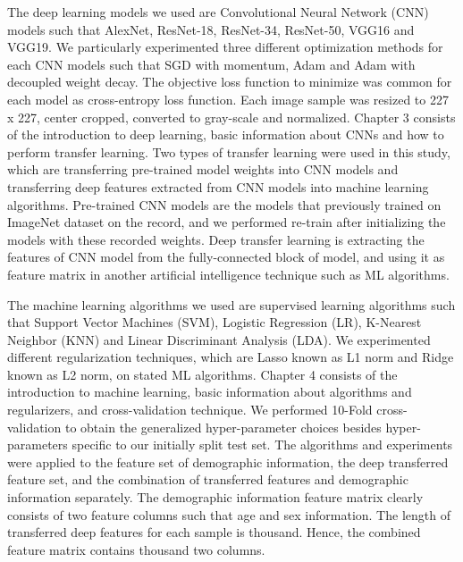 The deep learning models we used are Convolutional Neural Network (CNN) models such that AlexNet, ResNet-18, ResNet-34, ResNet-50, VGG16 and VGG19. We particularly experimented three different optimization methods for each CNN models such that SGD with momentum, Adam and Adam with decoupled weight decay. The objective loss function to minimize was common for each model as cross-entropy loss function. Each image sample was resized to 227 x 227, center cropped, converted to gray-scale and normalized. Chapter 3 consists of the introduction to deep learning, basic information about CNNs and how to perform transfer learning. Two types of transfer learning were used in this study, which are transferring pre-trained model weights into CNN models and transferring deep features extracted from CNN models into machine learning algorithms. Pre-trained CNN models are the models that previously trained on ImageNet dataset on the record, and we performed re-train after initializing the models with these recorded weights. Deep transfer learning is extracting the features of CNN model from the fully-connected block of model, and using it as feature matrix in another artificial intelligence technique such as ML algorithms.

The machine learning algorithms we used are supervised learning algorithms such that Support Vector Machines (SVM), Logistic Regression (LR), K-Nearest Neighbor (KNN) and Linear Discriminant Analysis (LDA). We experimented different regularization techniques, which are Lasso known as L1 norm and Ridge known as L2 norm, on stated ML algorithms. Chapter 4 consists of the introduction to machine learning, basic information about algorithms and regularizers, and cross-validation technique. We performed 10-Fold cross-validation to obtain the generalized hyper-parameter choices besides hyper-parameters specific to our initially split test set. The algorithms and experiments were applied to the feature set of demographic information, the deep transferred feature set, and the combination of transferred features and demographic information separately. The demographic information feature matrix clearly consists of two feature columns such that age and sex information. The length of transferred deep features for each sample is thousand. Hence, the combined feature matrix contains  thousand two columns.

